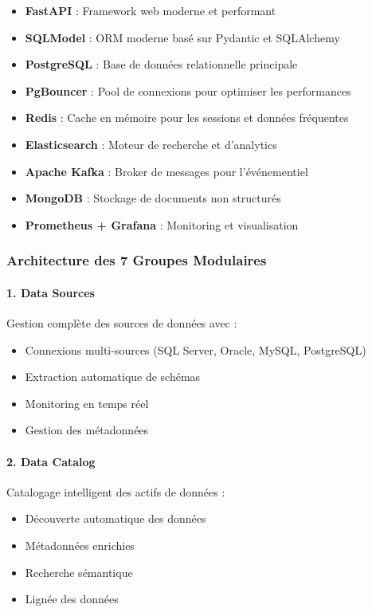 \documentclass[12pt,a4paper]{article}
\begin{document}
\begin{itemize}
    \item \textbf{FastAPI} : Framework web moderne et performant
    \item \textbf{SQLModel} : ORM moderne basé sur Pydantic et SQLAlchemy
    \item \textbf{PostgreSQL} : Base de données relationnelle principale
    \item \textbf{PgBouncer} : Pool de connexions pour optimiser les performances
    \item \textbf{Redis} : Cache en mémoire pour les sessions et données fréquentes
    \item \textbf{Elasticsearch} : Moteur de recherche et d'analytics
    \item \textbf{Apache Kafka} : Broker de messages pour l'événementiel
    \item \textbf{MongoDB} : Stockage de documents non structurés
    \item \textbf{Prometheus + Grafana} : Monitoring et visualisation
\end{itemize}

\subsubsection{Architecture des 7 Groupes Modulaires}

\paragraph{1. Data Sources}
Gestion complète des sources de données avec :
\begin{itemize}
    \item Connexions multi-sources (SQL Server, Oracle, MySQL, PostgreSQL)
    \item Extraction automatique de schémas
    \item Monitoring en temps réel
    \item Gestion des métadonnées
\end{itemize}

\paragraph{2. Data Catalog}
Catalogage intelligent des actifs de données :
\begin{itemize}
    \item Découverte automatique des données
    \item Métadonnées enrichies
    \item Recherche sémantique
    \item Lignée des données
\end{itemize}
\end{document}
